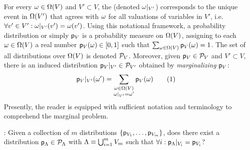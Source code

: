 \documentclass[aps, 10pt, english, twoside, twocolumn, pra, nofootinbib, tightenlines, longbibliography, superscriptaddress]{revtex4-1}
\begin{document}
    For every $\w \in \events{V}$ and $V' \subset V$, the  (denoted ${\omega}|_{V'}$) corresponds to the unique event in $\events{V'}$ that agrees with $\omega$ for all valuations of variables in $V'$, i.e. $\forall v' \in V': \restrict{\w}{V'}\br{v'} = \w\br{v'}$. Using this notational framework, a probability distribution or simply  ${\mathsf{p}}_{V}$ is a probability measure on $\events{V}$, assigning to each $\w \in \events{V}$ a real number $\prob{V}\br{\w} \in \bs{0,1}$ such that $\sum_{\w \in \events{V}} \prob{V}\br{\w} = 1$. The set of all distributions over $\events{V}$ is denoted $\mathcal{P}_{V}$. Moreover, given ${\mathsf{p}}_{V} \in \mathcal{P}_{V}$ and $V' \subset V$, there is an induced distribution ${{\mathsf{p}}_{V}}|_{V'} \in \mathcal{P}_{V'}$ obtained by \textit{marginalizing} ${\mathsf{p}}_{V}$:
    \[ \restrict{\prob{V}}{V'}\br{\w'} = \sum_{\substack{\w \in \events{V} \\ \restrict{\w}{V'} = \w'}} \prob{V}\br{\w} \eq \label{eq:marginalization_defined} \]
    Presently, the reader is equipped with sufficient notation and terminology to comprehend the marginal problem.
    \begin{definition}
        : Given a collection of $m$ distributions $\bc{\prob{V_1},\ldots,\prob{V_m}}$, does there exist a distribution ${\mathsf{p}}_{\Lambda} \in \mathcal{P}_{\Lambda}$ with $\Lambda \equiv \bigcup_{i = 1}^{m} V_m$ such that $\forall i : {{\mathsf{p}}_{\Lambda}}|_{V_i} = {\mathsf{p}}_{V_i}$?
    \end{definition}
\end{document}
